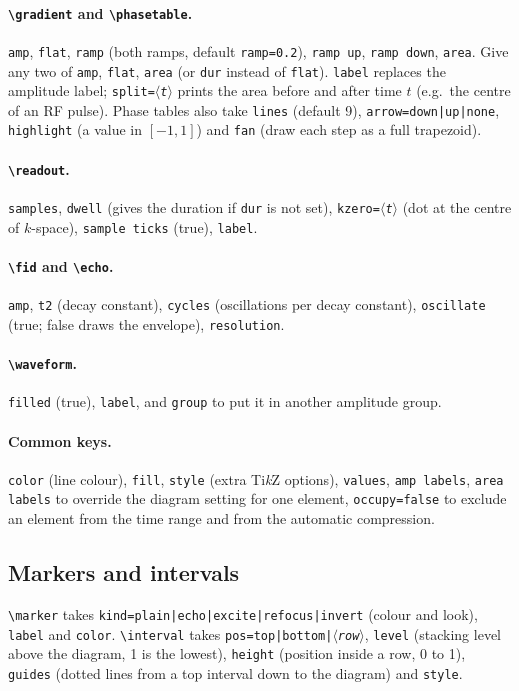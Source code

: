 \documentclass[11pt]{article}
\newcommand\cs[1]{\texttt{\textbackslash#1}}
\newcommand\key[1]{\texttt{#1}}
\newcommand\meta[1]{\ensuremath{\langle}\textit{#1}\ensuremath{\rangle}}
\begin{document}
\paragraph{\cs{gradient} and \cs{phasetable}.}
\key{amp}, \key{flat}, \key{ramp} (both ramps, default \key{ramp=0.2}),
\key{ramp up}, \key{ramp down}, \key{area}. Give any two of \key{amp},
\key{flat}, \key{area} (or \key{dur} instead of \key{flat}). \key{label}
replaces the amplitude label; \key{split=\meta{t}} prints the area before and
after time $t$ (e.g.\ the centre of an RF pulse). Phase tables also take
\key{lines} (default 9), \key{arrow=down|up|none}, \key{highlight} (a value in
$[-1,1]$) and \key{fan} (draw each step as a full trapezoid).

\paragraph{\cs{readout}.} \key{samples}, \key{dwell} (gives the duration if
\key{dur} is not set), \key{kzero=\meta{t}} (dot at the centre of $k$-space),
\key{sample ticks} (true), \key{label}.

\paragraph{\cs{fid} and \cs{echo}.} \key{amp}, \key{t2} (decay constant),
\key{cycles} (oscillations per decay constant), \key{oscillate} (true; false
draws the envelope), \key{resolution}.

\paragraph{\cs{waveform}.} \key{filled} (true), \key{label}, and
\key{group} to put it in another amplitude group.

\paragraph{Common keys.} \key{color} (line colour), \key{fill}, \key{style}
(extra Ti\emph{k}Z options), \key{values}, \key{amp labels}, \key{area labels}
to override the diagram setting for one element, \key{occupy=false} to exclude
an element from the time range and from the automatic compression.

\subsection{Markers and intervals}
\cs{marker} takes \key{kind=plain|echo|excite|refocus|invert} (colour and look),
\key{label} and \key{color}. \cs{interval} takes \key{pos=top|bottom|\meta{row}},
\key{level} (stacking level above the diagram, 1 is the lowest),
\key{height} (position inside a row, 0 to 1), \key{guides} (dotted lines from
a top interval down to the diagram) and \key{style}.
\end{document}
